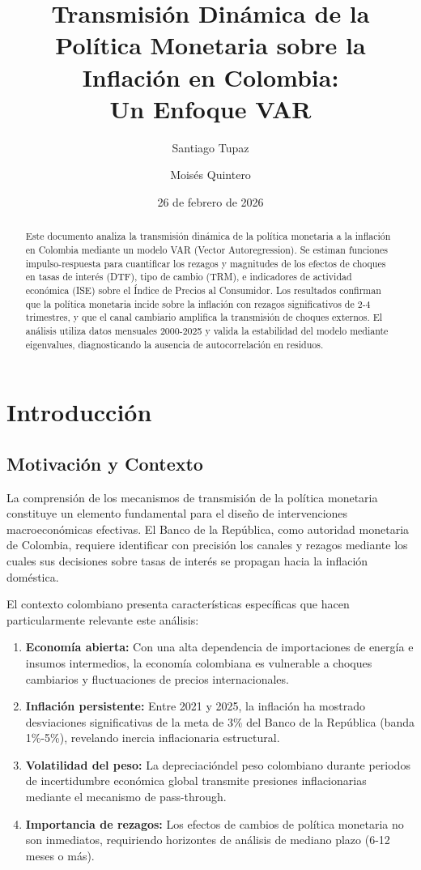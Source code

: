 \documentclass[12pt,a4paper]{article}
\title{\textbf{Transmisión Dinámica de la Política Monetaria sobre la Inflación en Colombia:\\
Un Enfoque VAR}}
\author{Santiago Tupaz \and Moisés Quintero}
\date{26 de febrero de 2026}
\begin{document}
\maketitle

\begin{abstract}
Este documento analiza la transmisión dinámica de la política monetaria a la inflación en Colombia mediante un modelo VAR (Vector Autoregression). Se estiman funciones impulso-respuesta para cuantificar los rezagos y magnitudes de los efectos de choques en tasas de interés (DTF), tipo de cambio (TRM), e indicadores de actividad económica (ISE) sobre el Índice de Precios al Consumidor. Los resultados confirman que la política monetaria incide sobre la inflación con rezagos significativos de 2-4 trimestres, y que el canal cambiario amplifica la transmisión de choques externos. El análisis utiliza datos mensuales 2000-2025 y valida la estabilidad del modelo mediante eigenvalues, diagnosticando la ausencia de autocorrelación en residuos.
\end{abstract}

\section{Introducción}

\subsection{Motivación y Contexto}

La comprensión de los mecanismos de transmisión de la política monetaria constituye un elemento fundamental para el diseño de intervenciones macroeconómicas efectivas. El Banco de la República, como autoridad monetaria de Colombia, requiere identificar con precisión los canales y rezagos mediante los cuales sus decisiones sobre tasas de interés se propagan hacia la inflación doméstica.

El contexto colombiano presenta características específicas que hacen particularmente relevante este análisis:

\begin{enumerate}
\item \textbf{Economía abierta:} Con una alta dependencia de importaciones de energía e insumos intermedios, la economía colombiana es vulnerable a choques cambiarios y fluctuaciones de precios internacionales.

\item \textbf{Inflación persistente:} Entre 2021 y 2025, la inflación ha mostrado desviaciones significativas de la meta de 3\% del Banco de la República (banda 1\%-5\%), revelando inercia inflacionaria estructural.

\item \textbf{Volatilidad del peso:} La depreciacióndel peso colombiano durante periodos de incertidumbre económica global transmite presiones inflacionarias mediante el mecanismo de pass-through.

\item \textbf{Importancia de rezagos:} Los efectos de cambios de política monetaria no son inmediatos, requiriendo horizontes de análisis de mediano plazo (6-12 meses o más).
\end{enumerate}
\end{document}
